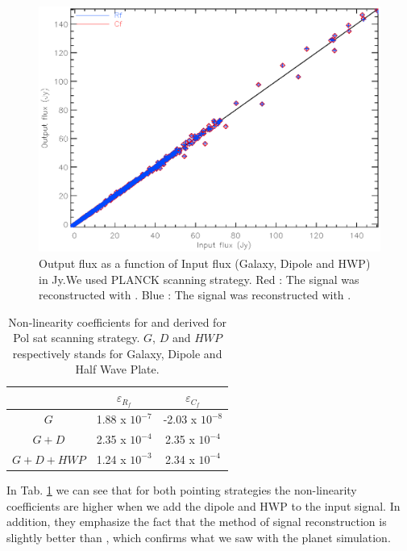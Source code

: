 \begin{figure}[h]
\center
	\includegraphics[scale=0.5]{Figures/NL-galaxy-hwp-dipole-planck.eps}
	\caption{Output flux as a function of Input flux (Galaxy, Dipole and HWP) in Jy.We used PLANCK scanning strategy. Red : The signal was reconstructed with \cf. Blue : The signal was reconstructed with \rf.}
	\label{fig:nl-galaxy-hwp-dipole-planck}
\end{figure}

\begin{table}[h!]
\center
	\begin{tabular}{|c|c|c|}
  	\hline
 	\backslashbox{$\varepsilon$}{$Input signal$} & $	\varepsilon_{R_{f}}$ & $\varepsilon_{C_{f}} $ \\
	\hline
	$G$  & 1.88 x $10^{-7}$ & -2.03 x $10^{-8}$ \\
 	\hline
 	$G+D$  & 2.35 x $10^{-4}$ & 2.35 x $10^{-4}$ \\
  	\hline
 	$G+D+HWP$ & 1.24 x $10^{-3}$ & 2.34 x $10^{-4}$ \\
  	\hline
	\end{tabular} 
\caption{Non-linearity coefficients \eps for \rf and \cf derived for Pol sat scanning strategy. $G$, $D$ and $HWP$ respectively stands for Galaxy, Dipole and Half Wave Plate.}
\label{tab:eps-galaxy-hwp-dipole-polsat}
\end{table}

In Tab. \ref{tab:eps-galaxy-hwp-dipole-polsat} we can see that for both pointing strategies the non-linearity coefficients are higher when we add the dipole and HWP to the input signal. In addition, they emphasize the fact that the \cf method of signal reconstruction is slightly better than \rf, which confirms what we saw with the planet simulation.\\


